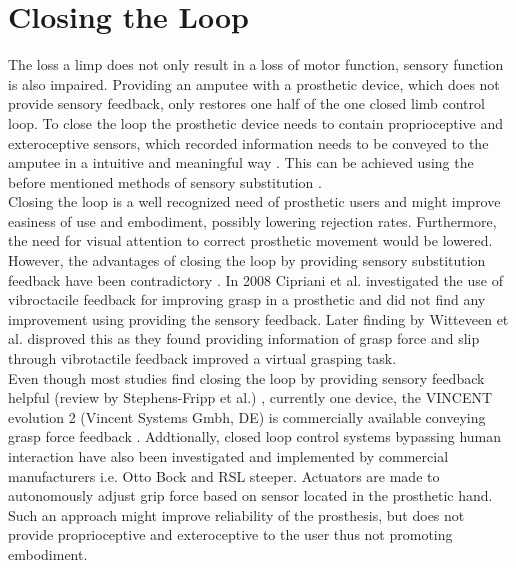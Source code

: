 \section{Closing the Loop}

The loss a limp does not only result in a loss of motor function, sensory function is also impaired. Providing an amputee with a prosthetic device, which does not provide sensory feedback, only restores one half of the one closed limb control loop. To close the loop the prosthetic device needs to contain proprioceptive and exteroceptive sensors, which recorded information needs to be conveyed to the amputee in a intuitive and meaningful way \cite{Markovic2018}. This can be achieved using the before mentioned methods of sensory substitution \cite{Schweisfurth2016}. \\
Closing the loop is a well recognized need of prosthetic users and might improve easiness of use and embodiment, possibly lowering rejection rates. Furthermore, the need for visual attention to correct prosthetic movement would be lowered. \cite{Strbac2016} However, the advantages of closing the loop by providing sensory substitution feedback have been contradictory \cite{Jorgovanovic2014}. In 2008 Cipriani et al. \cite{Cipriani2008} investigated the use of vibroctacile feedback for improving grasp in a prosthetic and did not find any improvement using providing the sensory feedback. Later finding by Witteveen et al. \cite{Witteveen2012} disproved this as they found providing information of grasp force and slip through vibrotactile feedback improved a virtual grasping task. \\
Even though most studies find closing the loop by providing sensory feedback helpful (review by Stephens-Fripp et al.) \cite{Stephens-Fripp2018}, currently one device, the VINCENT evolution 2 (Vincent Systems Gmbh, DE) is commercially available conveying grasp force feedback \cite{Systems2005}.  
Addtionally, closed loop control systems bypassing human interaction have also been investigated and implemented by commercial manufacturers i.e. Otto Bock and RSL steeper. Actuators are made to autonomously adjust grip force based on sensor located in the prosthetic hand. \cite{Xu2016} Such an approach might improve reliability of the prosthesis, but does not provide proprioceptive and exteroceptive to the user thus not promoting embodiment.  




